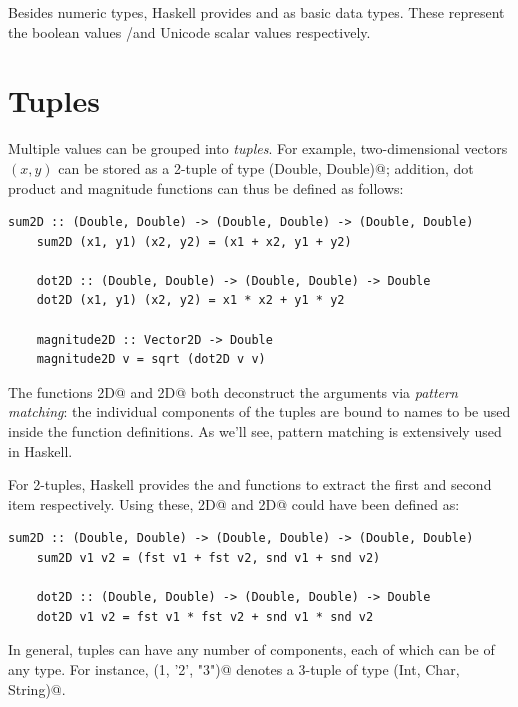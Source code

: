 \documentclass[UdineBachThesis,american,11pt]{PhdThesis}
\begin{document}
  Besides numeric types, Haskell provides \lstinline@Bool@ and \lstinline@Char@
  as basic data types. These represent the boolean values
  \lstinline@True@/\lstinline@False@ and Unicode scalar values respectively.

  \section{Tuples}

  Multiple values can be grouped into \emph{tuples}. For example,
  two-dimensional vectors $\left(x, y\right)$ can be stored as a 2-tuple of type
  \lstinline@(Double, Double)@; addition, dot product and magnitude functions
  can thus be defined as follows:

  \begin{lstlisting}[gobble=4,basicstyle=\ttfamily\small]
    sum2D :: (Double, Double) -> (Double, Double) -> (Double, Double)
    sum2D (x1, y1) (x2, y2) = (x1 + x2, y1 + y2)

    dot2D :: (Double, Double) -> (Double, Double) -> Double
    dot2D (x1, y1) (x2, y2) = x1 * x2 + y1 * y2

    magnitude2D :: Vector2D -> Double
    magnitude2D v = sqrt (dot2D v v)
  \end{lstlisting}

  The functions \lstinline@sum2D@ and \lstinline@dot2D@ both deconstruct the
  arguments via \emph{pattern matching}: the individual components of the tuples
  are bound to names to be used inside the function definitions. As we'll see,
  pattern matching is extensively used in Haskell.

  For 2-tuples, Haskell provides the \lstinline@fst@ and \lstinline@snd@
  functions to extract the first and second item respectively. Using these,
  \lstinline@sum2D@ and \lstinline@dot2D@ could have been defined as:

  \begin{lstlisting}[gobble=4,basicstyle=\ttfamily\small]
    sum2D :: (Double, Double) -> (Double, Double) -> (Double, Double)
    sum2D v1 v2 = (fst v1 + fst v2, snd v1 + snd v2)

    dot2D :: (Double, Double) -> (Double, Double) -> Double
    dot2D v1 v2 = fst v1 * fst v2 + snd v1 * snd v2
  \end{lstlisting}

  In general, tuples can have any number of components, each of which can be of
  any type. For instance, \lstinline@(1, '2', "3")@ denotes a 3-tuple of type
  \lstinline@(Int, Char, String)@.
\end{document}
